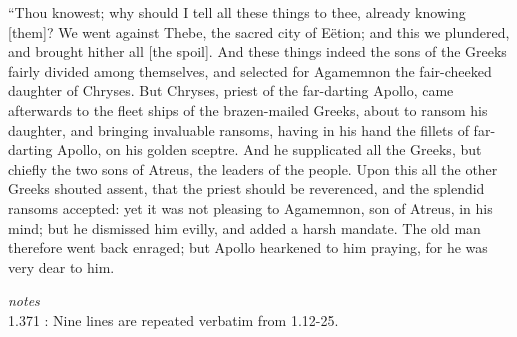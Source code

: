 \documentclass{ransom}
\begin{document}
“Thou
knowest; why should I tell all these things to thee, already knowing
[them]? We went against Thebe, the sacred city of Eëtion; and this
we plundered, and brought hither all [the spoil]. And these things
indeed the sons of the Greeks fairly divided among themselves, and
selected for Agamemnon the fair-cheeked daughter of Chryses. But
Chryses, priest of the far-darting Apollo, came afterwards to the fleet
ships of the brazen-mailed Greeks, about to ransom his daughter, and
bringing invaluable ransoms, having in his hand the fillets of
far-darting Apollo, on his golden sceptre. And he supplicated all the
Greeks, but chiefly the two sons of Atreus, the leaders of the people.
Upon this all the other Greeks shouted assent, that the priest should
be reverenced, and the splendid ransoms accepted: yet it was not
pleasing to Agamemnon, son of Atreus, in his mind; but he dismissed him
evilly, and added a harsh mandate. The old man therefore went back
enraged; but Apollo hearkened to him praying, for he was very dear to
him.
    \par
    \textit{notes}\\
    1.371 \textbf{}: Nine lines are repeated verbatim from 1.12-25.
\end{document}
